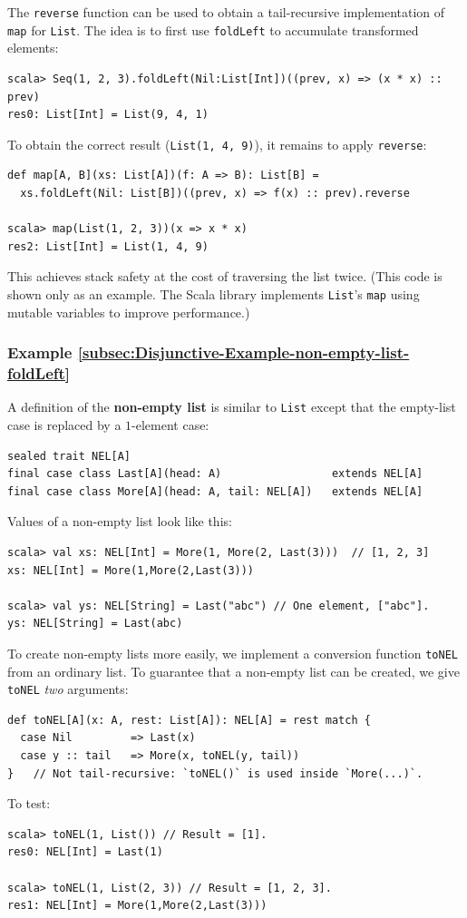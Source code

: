 The \lstinline!reverse! function can be used to obtain a tail-recursive
implementation of \lstinline!map! for \lstinline!List!. The idea
is to first use \lstinline!foldLeft! to accumulate transformed elements:
\begin{lstlisting}
scala> Seq(1, 2, 3).foldLeft(Nil:List[Int])((prev, x) => (x * x) :: prev)
res0: List[Int] = List(9, 4, 1)
\end{lstlisting}
To obtain the correct result (\lstinline!List(1, 4, 9)!), it remains
to apply \lstinline!reverse!:
\begin{lstlisting}
def map[A, B](xs: List[A])(f: A => B): List[B] =
  xs.foldLeft(Nil: List[B])((prev, x) => f(x) :: prev).reverse

scala> map(List(1, 2, 3))(x => x * x)
res2: List[Int] = List(1, 4, 9)
\end{lstlisting}
This achieves stack safety at the cost of traversing the list twice.
(This code is shown only as an example. The Scala library implements
\lstinline!List!\textsf{'}s \lstinline!map! using mutable variables to improve
performance.)

\subsubsection{Example \label{subsec:Disjunctive-Example-non-empty-list-foldLeft}\ref{subsec:Disjunctive-Example-non-empty-list-foldLeft}}

A definition of the \textbf{non-empty list}
is similar to \lstinline!List! except that the empty-list case is
replaced by a $1$-element case:
\begin{lstlisting}
sealed trait NEL[A]
final case class Last[A](head: A)                 extends NEL[A]
final case class More[A](head: A, tail: NEL[A])   extends NEL[A]
\end{lstlisting}
Values of a non-empty list look like this:
\begin{lstlisting}
scala> val xs: NEL[Int] = More(1, More(2, Last(3)))  // [1, 2, 3]
xs: NEL[Int] = More(1,More(2,Last(3)))

scala> val ys: NEL[String] = Last("abc") // One element, ["abc"].
ys: NEL[String] = Last(abc)
\end{lstlisting}
To create non-empty lists more easily, we implement a conversion function
\lstinline!toNEL! from an ordinary list. To guarantee that a non-empty
list can be created, we give \lstinline!toNEL! \emph{two} arguments:
\begin{lstlisting}
def toNEL[A](x: A, rest: List[A]): NEL[A] = rest match {
  case Nil         => Last(x)
  case y :: tail   => More(x, toNEL(y, tail))
}   // Not tail-recursive: `toNEL()` is used inside `More(...)`.
\end{lstlisting}
To test:
\begin{lstlisting}
scala> toNEL(1, List()) // Result = [1].
res0: NEL[Int] = Last(1)

scala> toNEL(1, List(2, 3)) // Result = [1, 2, 3].
res1: NEL[Int] = More(1,More(2,Last(3)))
\end{lstlisting}


